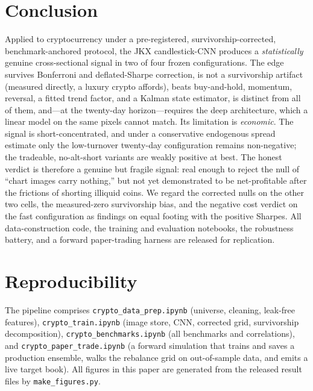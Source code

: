 \documentclass[11pt]{article}
\begin{document}
\section{Conclusion}

Applied to cryptocurrency under a pre-registered, survivorship-corrected, benchmark-anchored
protocol, the JKX candlestick-CNN produces a \emph{statistically} genuine cross-sectional signal in
two of four frozen configurations. The edge survives Bonferroni and deflated-Sharpe correction, is
not a survivorship artifact (measured directly, a luxury crypto affords), beats buy-and-hold,
momentum, reversal, a fitted trend factor, and a Kalman state estimator, is distinct from all of
them, and---at the twenty-day horizon---requires the deep architecture, which a linear model on the
same pixels cannot match. Its limitation is \emph{economic}. The signal is short-concentrated, and
under a conservative endogenous spread estimate only the low-turnover twenty-day configuration
remains non-negative; the tradeable, no-alt-short variants are weakly positive at best. The honest
verdict is therefore a genuine but fragile signal: real enough to reject the null of ``chart images
carry nothing,'' but not yet demonstrated to be net-profitable after the frictions of shorting
illiquid coins. We regard the corrected nulls on the other two cells, the measured-zero survivorship
bias, and the negative cost verdict on the fast configuration as findings on equal footing with the
positive Sharpes. All data-construction code, the training and evaluation notebooks, the robustness
battery, and a forward paper-trading harness are released for replication.

\section*{Reproducibility}
The pipeline comprises \texttt{crypto\_data\_prep.ipynb} (universe, cleaning, leak-free features),
\texttt{crypto\_train.ipynb} (image store, CNN, corrected grid, survivorship decomposition),
\texttt{crypto\_benchmarks.ipynb} (all benchmarks and correlations), and
\texttt{crypto\_paper\_trade.ipynb} (a forward simulation that trains and saves a production
ensemble, walks the rebalance grid on out-of-sample data, and emits a live target book). All figures
in this paper are generated from the released result files by \texttt{make\_figures.py}.
\end{document}
